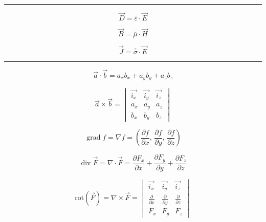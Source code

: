 \documentclass[12pt]{article}
\newcommand{\grayrule}{{\color{lightgray} \hrule}}
\begin{document}
\begin{multicols}{3}
\grayrule

\begin{equation*}
    \Vec{D} = \overline{\overline{\varepsilon}} \cdot \Vec{E}
\end{equation*}

\begin{equation*}
    \Vec{B} = \overline{\overline{\mu}} \cdot \Vec{H}
\end{equation*}

\begin{equation*}
    \Vec{J} = \overline{\overline{\sigma}} \cdot \Vec{E}
\end{equation*}

\grayrule


\begin{equation*}
    \Vec{a} \cdot \Vec{b} = a_x b_x + a_y b_y + a_z b_z
\end{equation*}

\begin{equation*}
    \Vec{a} \times \Vec{b}
        = \begin{vmatrix}
        \Vec{i_x} & \Vec{i_y} & \Vec{i_z} \\
        a_x & a_y & a_z \\
        b_x & b_y & b_z
        \end{vmatrix}
\end{equation*}

\begin{equation*}
    \operatorname{grad} f = \nabla f = \left(
            \frac{\partial f}{\partial x},\,
            \frac{\partial f}{\partial y},\,
            \frac{\partial f}{\partial z}
        \right)
\end{equation*}

\begin{equation*}
    \operatorname{div} \Vec{F}
        = \nabla \cdot \Vec{F}
        = \frac{\partial F_x}{\partial x}
            + \frac{\partial F_y}{\partial y}
            + \frac{\partial F_z}{\partial z}
\end{equation*}

\begin{equation*}
    \mathrm{rot}(\Vec{F}) = \nabla \times \Vec{F}
        = \begin{vmatrix}
        \Vec{i_x} & \Vec{i_y} & \Vec{i_z} \\
        \frac{\partial}{\partial x} & \frac{\partial}{\partial y} & \frac{\partial}{\partial z} \\
        F_x & F_y & F_z
        \end{vmatrix}
\end{equation*}


\end{multicols}
\end{document}

